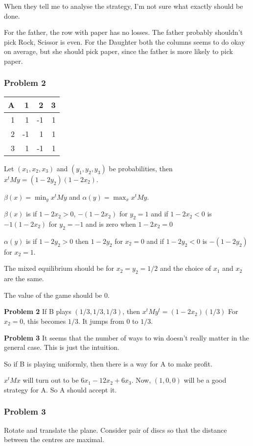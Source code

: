 \documentclass[11pt]{article}
\def\max{\operatorname{max}}
\def\min{\operatorname{min}}
\begin{document}
When they tell me to analyse the strategy, I'm not sure what exactly should
be done.

For the father, the row with paper has no losses. The father probably
shouldn't pick Rock, Scissor is even. For the Daughter both the columns
seems to do okay on average, but she should pick paper, since the father is
more likely to pick paper.
\subsubsection{Problem 2}
\label{sec:org95b3210}
\begin{center}
\begin{tabular}{rrrr}
A\B & 1 & 2 & 3\\
\hline
1 & 1 & -1 & 1\\
2 & -1 & 1 & 1\\
3 & 1 & -1 & 1\\
\end{tabular}
\end{center}

Let \((x_1, x_2, x_3)\) and \((y_1, y_2, y_3)\) be probabilities, then \(x^t M y
    = (1-2y_2)(1-2x_2)\).

\(\beta(x) = \min_{y} x^{t} M y\) and \(\alpha(y) = \max_{x} x^{t} M y\).

\(\beta(x)\) is if \(1 - 2x_2 > 0\), \(-(1-2x_2)\) for \(y_2 = 1\) and if \(1 - 2x_2
    < 0\) is \(-1(1-2x_2)\) for \(y_2 = -1\) and is zero when \(1-2x_2 = 0\)

\(\alpha(y)\) is if \(1-2y_2 > 0\) then \(1-2y_2\) for \(x_2 = 0\) and if \(1-2y_2 <
    0\) is \(-(1-2y_2)\) for \(x_2= 1\).

The mixed equilibrium should be for \(x_2 = y_2 = 1/2\) and the choice of
\(x_1\) and \(x_2\) are the same.

The value of the game should be \(0\).

\textbf{Problem 2} If B plays \((1/3, 1/3, 1/3)\), then \(x^{t} M y^{t} =
    (1-2x_2)(1/3)\) For \(x_2 = 0\), this becomes \(1/3\). It jumps from \(0\) to
\(1/3\).

\textbf{Problem 3} It seems that the number of ways to win doesn't really matter
in the general case. This is just the intuition.

So if B is playing uniformly, then there is a way for A to make profit.

\(x^t M x\) will turn out to be \(6x_1 -12x_2 + 6x_3\). Now, \((1, 0, 0)\) will be
a good strategy for A. So A should accept it.
\subsubsection{Problem 3}
\label{sec:org8ef5557}
Rotate and translate the plane. Consider pair of discs so that the distance
between the centres are maximal.
\end{document}
